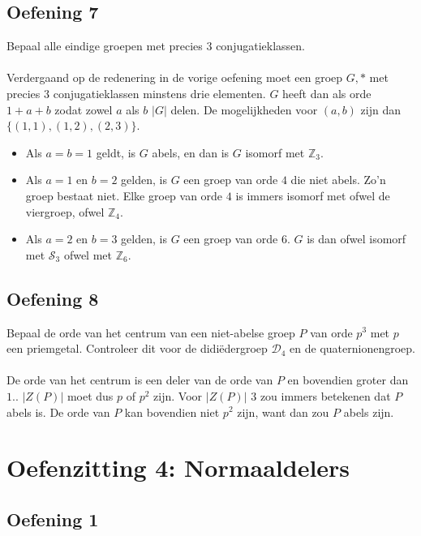 \documentclass[main.tex]{subfiles}
\begin{document}
\subsection*{Oefening 7}
\label{sec:oz3-oef6}
Bepaal alle eindige groepen met precies $3$ conjugatieklassen.\\\\
Verdergaand op de redenering in de vorige oefening moet een groep $G,*$ met precies $3$ conjugatieklassen minstens drie elementen.
$G$ heeft dan als orde $1+a+b$ zodat zowel $a$ als $b$ $|G|$ delen.
De mogelijkheden voor $(a,b)$ zijn dan $\{(1,1),(1,2),(2,3)\}$.
\begin{itemize}
\item Als $a = b = 1$ geldt, is $G$ abels, en dan is $G$ isomorf met $\mathbb{Z}_{3}$.
\item Als $a=1$ en $b=2$ gelden, is $G$ een groep van orde $4$ die niet abels. Zo'n groep bestaat niet.
  Elke groep van orde $4$ is immers isomorf met ofwel de viergroep, ofwel $\mathbb{Z}_{4}$.
\item Als $a=2$ en $b=3$ gelden, is $G$ een groep van orde $6$. $G$ is dan ofwel isomorf met $\mathcal{S}_{3}$ ofwel met $\mathbb{Z}_{6}$.
\end{itemize}

\subsection*{Oefening 8}
\label{sec:oz3-oef7}
Bepaal de orde van het centrum van een niet-abelse groep $P$ van orde $p^{3}$ met $p$ een priemgetal.
Controleer dit voor de didi\"edergroep $\mathcal{D}_{4}$ en de quaternionengroep.\\\\
De orde van het centrum is een deler van de orde van $P$  en bovendien groter dan $1$..
$|Z(P)|$ moet dus $p$ of $p^{2}$ zijn.
Voor $|Z(P)|$ $3$ zou immers betekenen dat $P$ abels is.
De orde van $P$ kan bovendien niet $p^{2}$ zijn, want dan zou $P$ abels zijn.


\section{Oefenzitting 4: Normaaldelers}

\subsection*{Oefening 1}
\label{sec:oz4-oef1}
\end{document}
